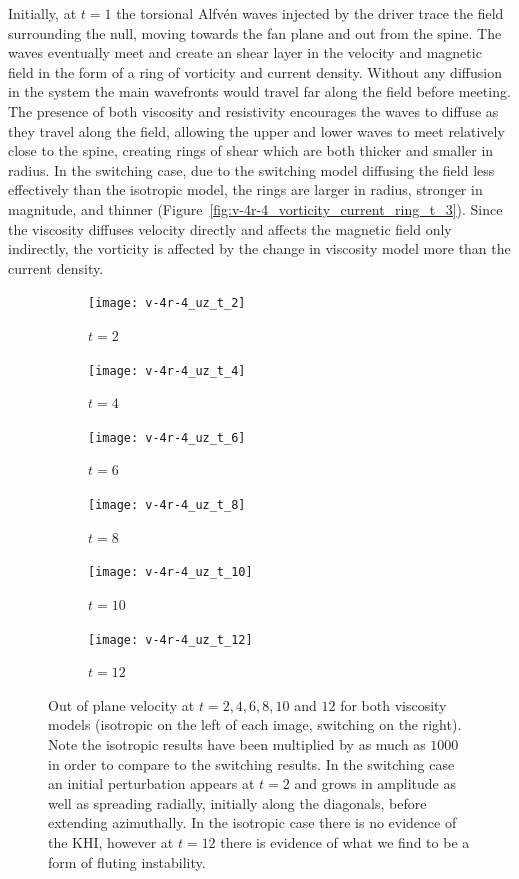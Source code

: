 Initially, at $t=1$ the torsional Alfv\'en waves injected by the driver trace the field surrounding the null, moving towards the fan plane and out from the spine. The waves eventually meet and create an shear layer in the velocity and magnetic field in the form of a ring of vorticity and current density. Without any diffusion in the system the main wavefronts would travel far along the field before meeting. The presence of both viscosity and resistivity encourages the waves to diffuse as they travel along the field, allowing the upper and lower waves to meet relatively close to the spine, creating rings of shear which are both thicker and smaller in radius. In the switching case, due to the switching model diffusing the field less effectively than the isotropic model, the rings are larger in radius, stronger in magnitude, and thinner (Figure~\ref{fig:v-4r-4_vorticity_current_ring_t_3}). Since the viscosity diffuses velocity directly and affects the magnetic field only indirectly, the vorticity is affected by the change in viscosity model more than the current density.

\begin{figure}[t]
  \centering
    \begin{subfigure}{0.32\textwidth}
      \texttt{[image: v-4r-4\_uz\_t\_2]}
      \caption{$t=2$}
      \label{fig:v-4r-4_uz_t_2}
    \end{subfigure}
    \begin{subfigure}{0.32\textwidth}
      \texttt{[image: v-4r-4\_uz\_t\_4]}
      \caption{$t=4$}
      \label{fig:v-4r-4_uz_t_4}
    \end{subfigure}
    \begin{subfigure}{0.32\textwidth}
      \texttt{[image: v-4r-4\_uz\_t\_6]}
      \caption{$t=6$}
      \label{fig:v-4r-4_uz_t_6}
    \end{subfigure}
    \begin{subfigure}{0.32\textwidth}
      \texttt{[image: v-4r-4\_uz\_t\_8]}
      \caption{$t=8$}
      \label{fig:v-4r-4_uz_t_8}
    \end{subfigure}
    \begin{subfigure}{0.32\textwidth}
      \texttt{[image: v-4r-4\_uz\_t\_10]}
      \caption{$t=10$}
      \label{fig:v-4r-4_uz_t_10}
    \end{subfigure}
    \begin{subfigure}{0.32\textwidth}
      \texttt{[image: v-4r-4\_uz\_t\_12]}
      \caption{$t=12$}
      \label{fig:v-4r-4_uz_t_12}
    \end{subfigure}
\caption{Out of plane velocity at $t=2, 4, 6, 8, 10$ and $12$ for both viscosity models (isotropic on the left of each image, switching on the right). Note the isotropic results have been multiplied by as much as $1000$ in order to compare to the switching results. In the switching case an initial perturbation appears at $t=2$ and grows in amplitude as well as spreading radially, initially along the diagonals, before extending azimuthally. In the isotropic case there is no evidence of the KHI, however at $t=12$ there is evidence of what we find to be a form of fluting instability.}
\label{fig:out_of_place_velocity}%
\end{figure}

